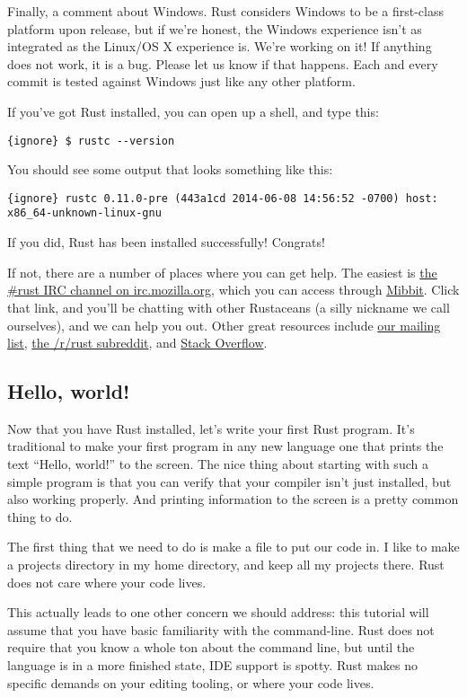 \documentclass[]{article}
\begin{document}
Finally, a comment about Windows. Rust considers Windows to be a
first-class platform upon release, but if we're honest, the Windows
experience isn't as integrated as the Linux/OS X experience is. We're
working on it! If anything does not work, it is a bug. Please let us
know if that happens. Each and every commit is tested against Windows
just like any other platform.

If you've got Rust installed, you can open up a shell, and type this:

\texttt{\{ignore\} \$ rustc -\/-version}

You should see some output that looks something like this:

\texttt{\{ignore\} rustc 0.11.0-pre (443a1cd 2014-06-08 14:56:52 -0700) host: x86\_64-unknown-linux-gnu}

If you did, Rust has been installed successfully! Congrats!

If not, there are a number of places where you can get help. The easiest
is \href{irc://irc.mozilla.org/\#rust}{the \#rust IRC channel on
irc.mozilla.org}, which you can access through
\href{http://chat.mibbit.com/?server=irc.mozilla.org\&channel=\%23rust}{Mibbit}.
Click that link, and you'll be chatting with other Rustaceans (a silly
nickname we call ourselves), and we can help you out. Other great
resources include \href{https://mail.mozilla.org/listinfo/rust-dev}{our
mailing list}, \href{http://www.reddit.com/r/rust}{the /r/rust
subreddit}, and
\href{http://stackoverflow.com/questions/tagged/rust}{Stack Overflow}.

\subsection{Hello, world!}\label{hello-world}

Now that you have Rust installed, let's write your first Rust program.
It's traditional to make your first program in any new language one that
prints the text ``Hello, world!'' to the screen. The nice thing about
starting with such a simple program is that you can verify that your
compiler isn't just installed, but also working properly. And printing
information to the screen is a pretty common thing to do.

The first thing that we need to do is make a file to put our code in. I
like to make a projects directory in my home directory, and keep all my
projects there. Rust does not care where your code lives.

This actually leads to one other concern we should address: this
tutorial will assume that you have basic familiarity with the
command-line. Rust does not require that you know a whole ton about the
command line, but until the language is in a more finished state, IDE
support is spotty. Rust makes no specific demands on your editing
tooling, or where your code lives.
\end{document}
